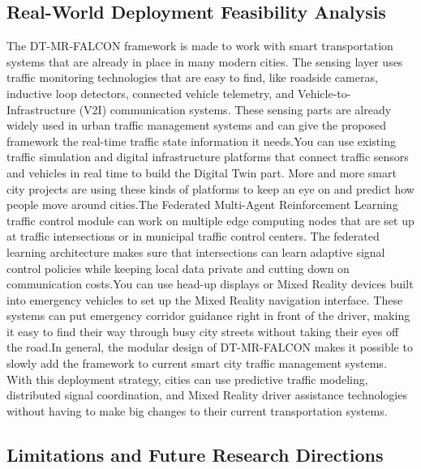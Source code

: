 \documentclass[conference]{IEEEtran}
\begin{document}
\subsection*{Real-World Deployment Feasibility Analysis}

The DT-MR-FALCON framework is made to work with smart transportation systems that are already in place in many modern cities. The sensing layer uses traffic monitoring technologies that are easy to find, like roadside cameras, inductive loop detectors, connected vehicle telemetry, and Vehicle-to-Infrastructure (V2I) communication systems. These sensing parts are already widely used in urban traffic management systems and can give the proposed framework the real-time traffic state information it needs.You can use existing traffic simulation and digital infrastructure platforms that connect traffic sensors and vehicles in real time to build the Digital Twin part. More and more smart city projects are using these kinds of platforms to keep an eye on and predict how people move around cities.The Federated Multi-Agent Reinforcement Learning traffic control module can work on multiple edge computing nodes that are set up at traffic intersections or in municipal traffic control centers. The federated learning architecture makes sure that intersections can learn adaptive signal control policies while keeping local data private and cutting down on communication costs.You can use head-up displays or Mixed Reality devices built into emergency vehicles to set up the Mixed Reality navigation interface. These systems can put emergency corridor guidance right in front of the driver, making it easy to find their way through busy city streets without taking their eyes off the road.In general, the modular design of DT-MR-FALCON makes it possible to slowly add the framework to current smart city traffic management systems. With this deployment strategy, cities can use predictive traffic modeling, distributed signal coordination, and Mixed Reality driver assistance technologies without having to make big changes to their current transportation systems.

\subsection*{Limitations and Future Research Directions}
\end{document}
